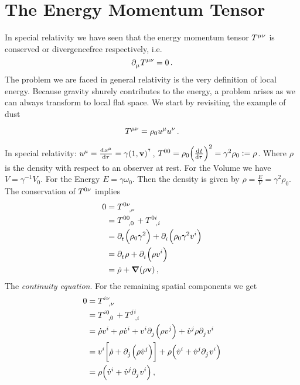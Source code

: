\chapter{The Energy Momentum Tensor}
In special relativity we have seen that the energy momentum tensor
$\tensor{T}{^\mu^\nu}$ is conserved or divergencefree respectively, i.e.
\begin{equation}
\tensor{\partial}{_\mu}\tensor{T}{^\mu^\nu}=0\,.\label{eq:EMcons}
\end{equation}
The problem we are faced in general relativity is the very definition of local
energy. Because gravity shurely contributes to the energy, a problem arises
as we can always transform to local flat space.
We start by revisiting the example of dust
\begin{example}[Dust]
\begin{equation}
\tensor{T}{^\mu^\nu}=\rho_0\tensor{u}{^\mu}\tensor{u}{^\nu}\,.
\end{equation}
\end{example}
In special relativity:
${\tensor{u}{^\mu}=\od{\tensor{x}{^\mu}}{\tau}=\gamma(1,\vec{v})\transpose}$,
${\tensor{T}{^0^0}=\rho_0\left(\od{t}{\tau}\right)^2}=\gamma^2\rho_0:=\rho$.
Where $\rho$ is the density with respect to an observer at rest. For the Volume
we have $V=\gamma^{-1}V_0$. For the Energy $E=\gamma\omega_0$. Then the density
is given by $\rho=\frac{E}{V}=\gamma^2\rho_0$. The conservation of
$\tensor{T}{^0^\nu}$ implies
\begin{equation}
\begin{split}
0&=\tensor{T}{^0^\nu_{,\nu}}\\
&=\tensor{T}{^0^0_{,0}}+\tensor{T}{^0^i_{,i}}\\
&=\tensor{\partial}{_t}\left(\rho_0\gamma^2\right)
+\tensor{\partial}{_i}\left(\rho_0\gamma^2\tensor{v}{^i}\right)\\
&=\tensor{\partial}{_t}\rho
+\tensor{\partial}{_i}\left(\rho \tensor{v}{^i}\right)\\
&=\dot{\rho}
+\boldsymbol{\nabla}\left(\rho \vec{v}\right)\,,
\end{split}
\end{equation}
The \emph{continuity equation}. For the remaining spatial components we get
\begin{equation}
\begin{split}
0&=\tensor{T}{^i^\nu_{,\nu}}\\
&=\tensor{T}{^i^0_{,0}}+\tensor{T}{^j^i_{,i}}\\
&=\dot{\rho}\tensor{v}{^i}
+\rho\tensor{\dot{v}}{^i}
+\tensor{v}{^i}\tensor{\partial}{_j}\left(\rho\tensor{v}{^j}\right)
+\tensor{\dot{v}}{^j}\rho\tensor{\partial}{_j}\tensor{v}{^i}\\
&=\tensor{v}{^i}\left[\dot{\rho}+\tensor{\partial}{_j}\left(\rho\tensor{\dot{v}}{^j}\right)\right]
+\rho\left(\tensor{\dot{v}}{^i}+\tensor{\dot{v}}{^j}\tensor{\partial}{_j}\tensor{v}{^i}\right)\\
&=\rho\left(\tensor{\dot{v}}{^i}+\tensor{\dot{v}}{^j}\tensor{\partial}{_j}\tensor{v}{^i}\right)\,,
\end{split}
\end{equation}
